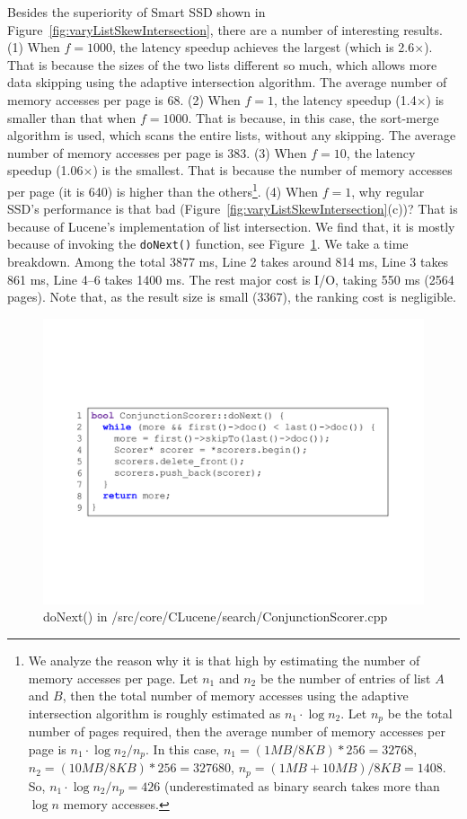 Besides the superiority of Smart SSD shown in Figure~\ref{fig:varyListSkewIntersection}, there are a number of interesting results. (1) When $f=1000$, the latency speedup achieves the largest (which is 2.6$\times$). That is because the sizes of the two lists different so much, which allows more data skipping using the adaptive intersection algorithm. The average number of memory accesses per page is 68. (2) When $f=1$, the latency speedup (1.4$\times$) is smaller than that when $f=1000$. That is because, in this case, the sort-merge algorithm is used, which scans the entire lists, without any skipping. The average number of memory accesses per page is 383. (3) When $f = 10$, the latency speedup (1.06$\times$) is the smallest. That is because the number of memory accesses per page (it is 640) is higher than the others\footnote{\scriptsize We analyze the reason why it is that high by estimating the number of memory accesses per page. Let $n_1$ and $n_2$ be the number of entries of list $A$ and $B$, then the total number of memory accesses using the adaptive intersection algorithm is roughly estimated as $n_1\cdot\log n_2$. Let $n_p$ be the total number of pages required, then the average number of memory accesses per page is $n_1\cdot\log n_2/n_p$. In this case, $n_1=(1MB/8 KB)*256=32768$, $n_2=(10MB/8KB)*256=327680$, $n_p=(1MB+10MB)/8KB=1408$. So, $n_1\cdot\log n_2/n_p=426$ (underestimated as binary search takes more than $\log n$ memory accesses.}. (4) When $f=1$, why regular SSD's performance is that bad (Figure~\ref{fig:varyListSkewIntersection}(c))? That is because of Lucene's implementation of list intersection. We find that, it is mostly because of invoking the \texttt{doNext()} function, see Figure~\ref{fig:doNext}. We take a time breakdown. Among the total 3877 ms, Line 2 takes around 814 ms, Line 3 takes 861 ms, Line 4--6 takes 1400 ms. The rest major cost is I/O, taking 550 ms (2564 pages). Note that, as the result size is small (3367), the ranking cost is negligible.

\begin{figure}[tbp]
	\centering
		\includegraphics[width=1\columnwidth]{figures/doNext.pdf}
	\caption{\small doNext() in /src/core/CLucene/search/ConjunctionScorer.cpp}
	\label{fig:doNext}
\end{figure}


